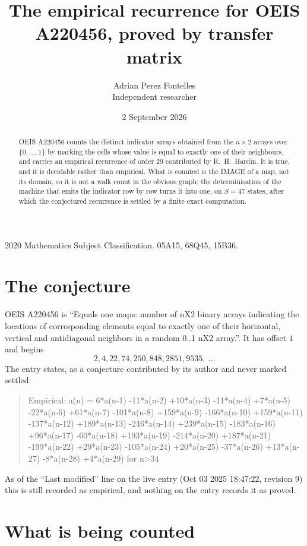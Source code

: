 \documentclass[11pt,a4paper]{article}
\title{The empirical recurrence for OEIS A220456, proved by transfer matrix}
\author{Adrian Perez Fontelles\\ \small Independent researcher}
\date{2 September 2026}
\theoremstyle{plain}
\theoremstyle{definition}
\begin{document}
\maketitle

\begin{abstract}
OEIS A220456 counts the distinct indicator arrays obtained from the $n\times2$ arrays over
$\{0,\dots,1\}$ by marking the cells whose value is equal to exactly one of their neighbours, and carries an
empirical recurrence of order $29$ contributed by R.~H.~Hardin. It is true, and it is
decidable rather than empirical. What is counted is the IMAGE of a map, not its domain, so it
is not a walk count in the obvious graph; the determinisation of the machine that emits the
indicator row by row turns it into one, on $S=47$ states, after which the conjectured
recurrence is settled by a finite exact computation.
\end{abstract}

\noindent\small 2020 Mathematics Subject Classification. 05A15, 68Q45, 15B36.\normalsize

\section{The conjecture}

OEIS A220456 is ``Equals one maps: number of nX2 binary arrays indicating the locations of corresponding elements equal to exactly one of their horizontal, vertical and antidiagonal neighbors in a random 0..1 nX2 array.''. It has offset $1$ and begins
\[
2, 4, 22, 74, 250, 848, 2851, 9535,\ \dots
\]
The entry states, as a conjecture contributed by its author and never marked settled:
\begin{quote}
Empirical: a(n) = 6*a(n-1) -11*a(n-2) +10*a(n-3) -11*a(n-4) +7*a(n-5) -22*a(n-6) +61*a(n-7) -101*a(n-8) +159*a(n-9) -166*a(n-10) +159*a(n-11) -137*a(n-12) +189*a(n-13) -246*a(n-14) +239*a(n-15) -183*a(n-16) +96*a(n-17) -60*a(n-18) +193*a(n-19) -214*a(n-20) +187*a(n-21) -199*a(n-22) +29*a(n-23) -105*a(n-24) +20*a(n-25) -37*a(n-26) +13*a(n-27) -8*a(n-28) +4*a(n-29) for n>34
\end{quote}
As of the ``Last modified'' line on the live entry (Oct 03 2025 18:47:22, revision 9) this is still
recorded as empirical, and nothing on the entry records it as proved.

\section{What is being counted}
\end{document}
